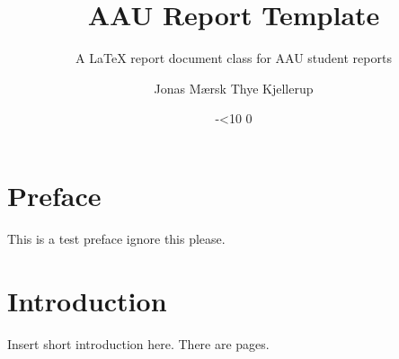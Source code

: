 \documentclass[11pt]{aau-report}
\title{AAU Report Template}
\subtitle{A \LaTeX{} report document class for AAU student reports}
\author{Jonas Mærsk Thye Kjellerup}
\date{\the\year-\ifnum\month<10 0\fi\the\month}
\begin{document}
\frontmatter
\def\bothFrontpages{1}
\cleardoublepage

\tableofcontents
\chapter{Preface}
This is a test preface ignore this please.

\mainmatter
\chapter{Introduction}
Insert short introduction here. There are \pageref{LastPage} pages.
\end{document}
